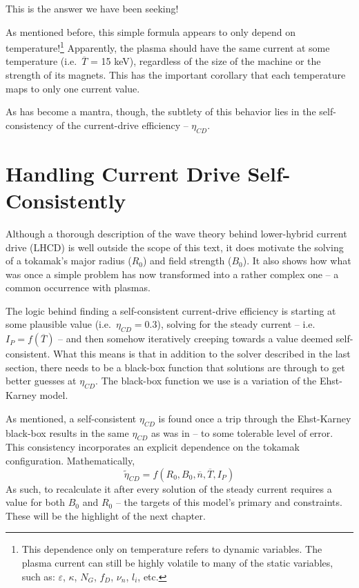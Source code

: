 This is the answer we have been seeking!

As mentioned before, this simple formula appears to only depend on temperature!\footnote{ This dependence only on temperature refers to dynamic variables. The plasma current can still be highly volatile to many of the static variables, such as: $\varepsilon$, $\kappa$, $N_G$, $f_D$, $\nu_n$, $l_i$, etc. } Apparently, the plasma should have the same current at some temperature (i.e.\ $\overline T$ = 15 keV), regardless of the size of the machine or the strength of its magnets. This has the important corollary that each temperature maps to only one current value. 

As has become a mantra, though, the subtlety of this behavior lies in the self-consistency of the current-drive efficiency -- $\eta_{CD}$.

\section{Handling Current Drive Self-Consistently}

Although a thorough description of the wave theory behind lower-hybrid current drive (LHCD) is well outside the scope of this text, it does motivate the solving of a tokamak's major radius ($R_0$) and field strength ($B_0$). It also shows how what was once a simple problem has now transformed into a rather complex one -- a common occurrence with plasmas.

The logic behind finding a self-consistent current-drive efficiency is starting at some plausible value (i.e.\ $\eta_{CD} = 0.3$), solving for the steady current -- i.e.\ $I_P = f(\overline T)$ -- and then somehow iteratively creeping towards a value deemed self-consistent. What this means is that in addition to the solver described in the last section, there needs to be a black-box function that solutions are  through to get better guesses at $\eta_{CD}$. The black-box function we use is a variation of the Ehst-Karney model. \cite{ehstkarney} 

As mentioned,  a self-consistent $\eta_{CD}$ is found once a trip through the Ehst-Karney black-box results in the same $\eta_{CD}$ as was  in -- to some tolerable level of error. This consistency incorporates an explicit dependence on the tokamak configuration. Mathematically,
\begin{equation}
	\tilde \eta_{CD} = f( R_0, B_0, \overline n, \overline T, I_P )
\end{equation}
As such, to recalculate it after every solution of the steady current requires a value for both $B_0$ and $R_0$ -- the targets of this model's primary and  constraints. These will be the highlight of the next chapter.

%
